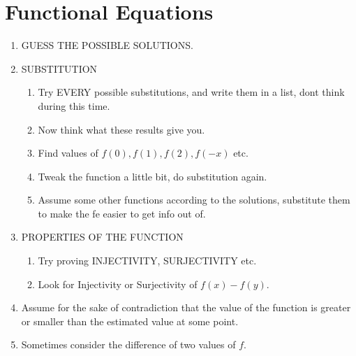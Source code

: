 \newpage\section{Functional Equations}

	
	\begin{take_note*}[title={Can't Start? Try These}]{}
		\begin{enumerate}[wide=0em, label=\arabic*, itemsep=10pt, parsep=5pt, font=\bfseries]
			
			\item GUESS THE POSSIBLE SOLUTIONS.
			
			\item SUBSTITUTION 
			
			\begin{enumerate}[wide=7mm, label=\alph*, itemsep=10pt, parsep=5pt, font=\bfseries]
				\item Try EVERY possible substitutions, and write them in a list, dont think during this time.
				
				\item Now think what these results give you.
				
				\item Find values of $ f(0), f(1), f(2), f(-x) $ etc.
				
				\item Tweak the function a little bit, do substitution again.
				
				\item Assume some other functions according to the solutions, substitute them to make the fe easier to get info out of.
			\end{enumerate}
			
			\item PROPERTIES OF THE FUNCTION
			
			\begin{enumerate}[wide=7mm, label=\alph*, itemsep=10pt, parsep=5pt, font=\bfseries]
				\item Try proving INJECTIVITY, SURJECTIVITY etc.
				
				\item Look for Injectivity or Surjectivity of $ f(x)-f(y) $.
			\end{enumerate}
			
			\item Assume for the sake of contradiction that the value of the function is greater or smaller than the estimated value at some point.
			
			\item Sometimes consider the difference of two values of $ f $.
			
		\end{enumerate}
	\end{take_note*}
	
